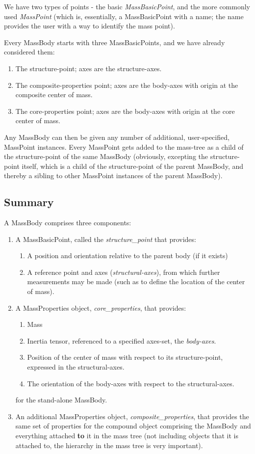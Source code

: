 We have two types of points - the basic \textit{MassBasicPoint}, and the more 
commonly used \textit{MassPoint} (which is, essentially, a MassBasicPoint with 
a name; the name provides the user with a way to identify the mass point).

Every MassBody starts with three MassBasicPoints, and we have already 
considered them:
\begin{enumerate}
  \item The structure-point; axes are the structure-axes.
  \item The composite-properties point; axes are the body-axes with origin at 
  the composite center of mass.
  \item The core-properties point; axes are the body-axes with origin at the 
  core center of mass.
\end{enumerate}

Any MassBody can then be given any number of additional, user-specified, 
MassPoint instances.  Every MassPoint gets added to the mass-tree as a child 
of the structure-point of the same MassBody (obviously, excepting the 
structure-point itself, which is a child of the structure-point of the parent 
MassBody, and thereby a sibling to other MassPoint instances of the parent 
MassBody).


\subsection {Summary}
A MassBody comprises three components:
\begin{enumerate}
 \item A MassBasicPoint, called the \textit{structure\_point} that provides:
 \begin{enumerate}
  \item A position and orientation relative to the parent body (if it exists)
  \item A reference point and axes (\textit{structural-axes}), from which 
  further measurements may be made (such as to define the location of the 
  center of mass).
 \end{enumerate}
 \item A MassProperties object, \textit{core\_properties}, that provides:
   \begin{enumerate}
   \item Mass
   \item Inertia tensor, referenced to a specified axes-set, the 
   \textit{body-axes}.
   \item Position of the center of mass with respect to its structure-point, 
   expressed in the structural-axes.
   \item The orientation of the body-axes with respect to the 
   structural-axes.
   \end{enumerate}
   for the stand-alone MassBody.
  \item An additional MassProperties object, \textit{composite\_properties}, 
  that provides the same set of properties for the compound object comprising 
  the MassBody and everything attached \textbf{to} it in the mass tree (not 
  including objects that it is attached to, the hierarchy in the mass tree is 
  very important).
\end{enumerate}